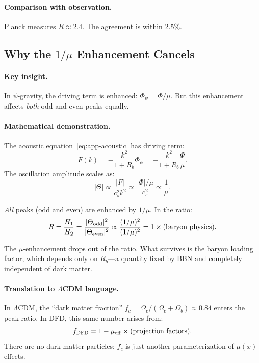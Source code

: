 \paragraph{Comparison with observation.}
Planck measures $R \approx 2.4$. The agreement is within 2.5\%.

\subsection{Why the $1/\mu$ Enhancement Cancels}\label{app:mu-cancellation}

\paragraph{Key insight.}
In $\psi$-gravity, the driving term is enhanced: $\Phi_\psi = \Phi/\mu$. But this enhancement affects \textit{both} odd and even peaks equally.

\paragraph{Mathematical demonstration.}
The acoustic equation~\eqref{eq:app-acoustic} has driving term:
\begin{equation}
F(k) = -\frac{k^2}{1+R_b} \Phi_\psi = -\frac{k^2}{1+R_b} \frac{\Phi}{\mu}.
\end{equation}
The oscillation amplitude scales as:
\begin{equation}
|\Theta| \propto \frac{|F|}{c_s^2 k^2} \propto \frac{|\Phi|/\mu}{c_s^2} \propto \frac{1}{\mu}.
\end{equation}

\textit{All} peaks (odd and even) are enhanced by $1/\mu$. In the ratio:
\begin{equation}
R = \frac{H_1}{H_2} = \frac{|\Theta_{\rm odd}|^2}{|\Theta_{\rm even}|^2} \propto \frac{(1/\mu)^2}{(1/\mu)^2} = 1 \times (\text{baryon physics}).
\end{equation}

The $\mu$-enhancement drops out of the ratio. What survives is the baryon loading factor, which depends only on $R_b$---a quantity fixed by BBN and completely independent of dark matter.

\paragraph{Translation to $\Lambda$CDM language.}
In $\Lambda$CDM, the ``dark matter fraction'' $f_c = \Omega_c/(\Omega_c+\Omega_b) \approx 0.84$ enters the peak ratio. In DFD, this same number arises from:
\begin{equation}
f_{\rm DFD} = 1 - \mu_{\rm eff} \times (\text{projection factors}).
\end{equation}
There are no dark matter particles; $f_c$ is just another parameterization of $\mu(x)$ effects.


